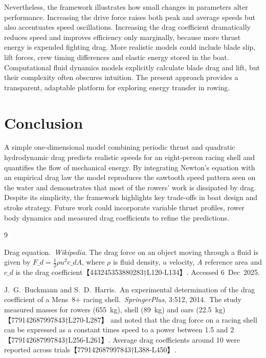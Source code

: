\documentclass[11pt]{article}
\begin{document}
Nevertheless, the framework illustrates how small changes in parameters
alter performance.  Increasing the drive force raises both peak and
average speeds but also accentuates speed oscillations.  Increasing the
drag coefficient dramatically reduces speed and improves efficiency only
marginally, because more thrust energy is expended fighting drag.  More
realistic models could include blade slip, lift forces, crew timing
differences and elastic energy stored in the boat.  Computational fluid
dynamics models explicitly calculate blade drag and lift, but their
complexity often obscures intuition.  The present approach provides a
transparent, adaptable platform for exploring energy transfer in rowing.

\section{Conclusion}

A simple one‑dimensional model combining periodic thrust and quadratic
hydrodynamic drag predicts realistic speeds for an eight‑person racing
shell and quantifies the flow of mechanical energy.  By integrating
Newton’s equation with an empirical drag law the model reproduces the
sawtooth speed pattern seen on the water and demonstrates that most of
the rowers’ work is dissipated by drag.  Despite its simplicity, the
framework highlights key trade‑offs in boat design and stroke strategy.
Future work could incorporate variable thrust profiles, rower body
dynamics and measured drag coefficients to refine the predictions.


\begin{thebibliography}{9}

  Drag equation.\ \emph{Wikipedia}.  The drag force on an object moving
  through a fluid is given by \(F\_d = \tfrac{1}{2}\rho u^2 c\_d A\), where
  \(\rho\) is fluid density, \(u\) velocity, \(A\) reference area and
  \(c\_d\) is the drag coefficient【443245353880283†L120-L134】.  Accessed
  6~Dec~2025.

  J.~G.~Buckmann and S.~D.~Harris.\ An experimental determination of the drag
  coefficient of a Mens~8+ racing shell.\ \emph{SpringerPlus}, 3:512, 2014.\
  The study measured masses for rowers (\SI{655}{kg}), shell (\SI{89}{kg}) and
  oars (\SI{22.5}{kg})【779142687997843†L270-L287】 and noted that the drag force
  on a racing shell can be expressed as a constant times speed to a power
  between 1.5 and 2【779142687997843†L256-L261】.  Average drag coefficients
  around 10 were reported across trials【779142687997843†L388-L450】.

\end{thebibliography}
\end{document}

